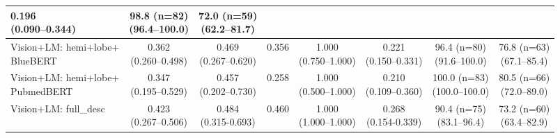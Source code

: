 \documentclass[FCD_GNN.tex]{subfiles}
\begin{document}
\begin{table}[H]
\begin{threeparttable}
\begin{tabular}{lccccccc}
    \makecell{0.196\\(0.090--0.344)} &
    \makecell{\colorbox{cyan!15}{98.8 (n=82)} \\ (96.4--100.0)} &
    \makecell{72.0 (n=59) \\ (62.2--81.7)} \\
    \hline
    Vision+LM: \makecell{hemi+lobe+\\BlueBERT} &
    \makecell{0.362\\(0.260--0.498)} &
    \makecell{\colorbox{cyan!15}{0.469}\\(0.267--0.620)} &
    0.356 &
    \makecell{1.000\\(0.750--1.000)} &
    \makecell{0.221\\(0.150--0.331)} &
    \makecell{96.4 (n=80) \\ (91.6--100.0)} &
    \makecell{\colorbox{orange!15}{76.8 (n=63)} \\ (67.1--85.4)} \\
    \hline
    Vision+LM: \makecell{hemi+lobe+ \\ PubmedBERT} &
    \makecell{0.347\\(0.195--0.529)} &
    \makecell{\colorbox{orange!15}{0.457}\\(0.202--0.730)} &
    0.258 &
    \makecell{1.000 \\ (0.500--1.000)} &
    \makecell{0.210\\(0.109--0.360)} &
    \makecell{\colorbox{green!15}{100.0 (n=83)} \\ (100.0--100.0)} &
    \makecell{\colorbox{green!15}{80.5 (n=66)} \\ (72.0--89.0)} \\
    \hline
    Vision+LM: full\_desc  &
    \makecell{\colorbox{green!15}{0.423}\\(0.267--0.506)} &
    \makecell{\colorbox{green!15}{0.484}\\(0.315-0.693)} &
    0.460 &
    \makecell{1.000 \\ (1.000--1.000)} &
    \makecell{\colorbox{green!15}{0.268}\\(0.154-0.339)} &
    \makecell{90.4 (n=75) \\ (83.1--96.4)} &
    \makecell{73.2 (n=60) \\ (63.4--82.9)} \\
    
    \bottomrule
    \end{tabular}
    

\end{threeparttable}
\end{table}
\end{document}
